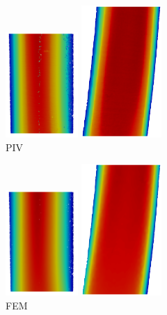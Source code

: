 \begin{figure}\centering
\begin{minipage}[c][10cm][c]{0.25\textwidth}
\centering
\vspace*{\fill}
\includegraphics[height=4cm]{imgs/vena_cava/PIV_coronal_rest.png}
\includegraphics[height=5cm]{imgs/vena_cava/PIV_sagittal_rest.png}
\\PIV
\end{minipage}
\begin{minipage}[c][10cm][c]{0.25\textwidth}
\centering
\vspace*{\fill}
\includegraphics[height=4cm]{imgs/vena_cava/FEM_coronal_rest.png}
\includegraphics[height=5cm]{imgs/vena_cava/FEM_sagittal_rest.png}
\\FEM

\end{minipage}
\end{figure}
